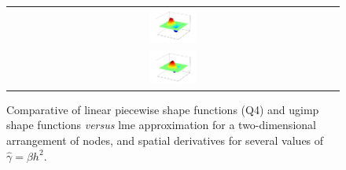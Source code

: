\documentclass[preprint,12pt,a4paper]{elsarticle}
\begin{document}
\begin{figure}
{\begin{tabular}{c}
      \includegraphics[width=0.14\textwidth]{Figures/GIMP_Shape_Fun_dx}\\
      \includegraphics[width=0.14\textwidth]{Figures/GIMP_Shape_Fun_dy}
    \end{tabular}
  }
  \caption{Comparative of linear piecewise shape functions (Q4) and
    \acrshort{ugimp} shape functions \textit{versus}  \acrshort{lme}
    approximation for a two-dimensional arrangement of nodes, and
    spatial derivatives for several values of $\widehat{\gamma} = \beta h^2$.}
  \label{fig:LME_MPM}
\end{figure}
\end{document}
